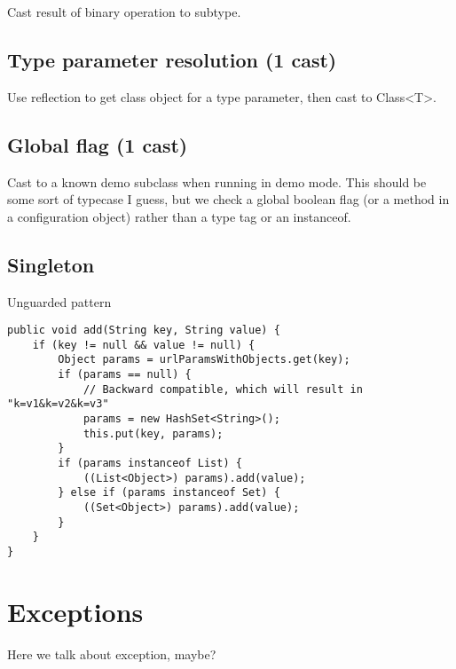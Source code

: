 \documentclass{usiinfdocprop}
\begin{document}
Cast result of binary operation to subtype. 

\section{Type parameter resolution (1 cast)}
\label{sec:org9cfdb15}

Use reflection to get class object for a type parameter, then cast to Class<T>. 

\section{Global flag (1 cast)}
\label{sec:orgcbf8be9}

Cast to a known demo subclass when running in demo mode. 
This should be some sort of typecase I guess, but we check a global boolean flag (or a method in a configuration object) rather than a type tag or an instanceof. 

\section{Singleton}
\label{sec:orgc67407e}
Unguarded pattern 

\lstset{language=java,label= ,caption= ,captionpos=b,numbers=none}
\begin{lstlisting}
public void add(String key, String value) { 
    if (key != null && value != null) { 
        Object params = urlParamsWithObjects.get(key); 
        if (params == null) { 
            // Backward compatible, which will result in "k=v1&k=v2&k=v3" 
            params = new HashSet<String>(); 
            this.put(key, params); 
        } 
        if (params instanceof List) { 
            ((List<Object>) params).add(value); 
        } else if (params instanceof Set) { 
            ((Set<Object>) params).add(value); 
        } 
    } 
} 
\end{lstlisting}

\chapter{Exceptions \label{org10d264b}}
\label{sec:orge00a277}

Here we talk about exception, maybe?



\end{document}
